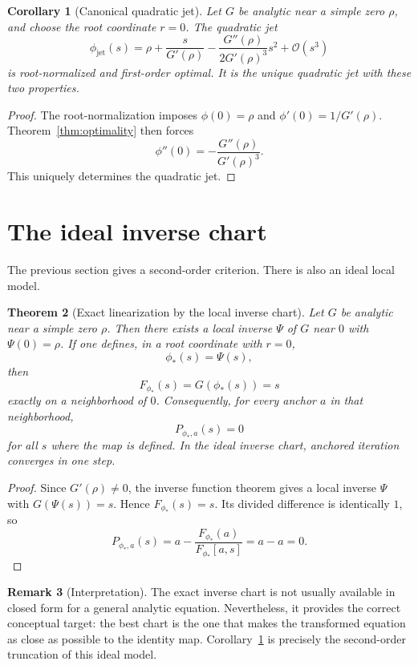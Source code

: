 \documentclass[11pt]{article}
\newtheorem{theorem}{Theorem}[section]
\newtheorem{corollary}[theorem]{Corollary}
\theoremstyle{definition}
\newtheorem{remark}[theorem]{Remark}
\newcommand{\Oterm}{\mathcal{O}}
\begin{document}
\begin{corollary}[Canonical quadratic jet]\label{cor:quadratic-jet}
Let $G$ be analytic near a simple zero $\rho$, and choose the root coordinate $r=0$. The quadratic jet
\begin{equation}\label{eq:jet-optimal}
\phi_{\mathrm{jet}}(s)=\rho+\frac{s}{G'(\rho)}-\frac{G''(\rho)}{2G'(\rho)^3}s^2+\Oterm(s^3)
\end{equation}
is root-normalized and first-order optimal. It is the unique quadratic jet with these two properties.
\end{corollary}

\begin{proof}
The root-normalization imposes $\phi(0)=\rho$ and $\phi'(0)=1/G'(\rho)$. Theorem~\ref{thm:optimality} then forces
\[
\phi''(0)=-\frac{G''(\rho)}{G'(\rho)^3}.
\]
This uniquely determines the quadratic jet.
\end{proof}

\section{The ideal inverse chart}
The previous section gives a second-order criterion. There is also an ideal local model.

\begin{theorem}[Exact linearization by the local inverse chart]\label{thm:inversechart}
Let $G$ be analytic near a simple zero $\rho$. Then there exists a local inverse $\Psi$ of $G$ near $0$ with $\Psi(0)=\rho$. If one defines, in a root coordinate with $r=0$,
\begin{equation}\label{eq:exact-inverse-chart}
\phi_*(s)=\Psi(s),
\end{equation}
then
\[
F_{\phi_*}(s)=G(\phi_*(s))=s
\]
exactly on a neighborhood of $0$. Consequently, for every anchor $a$ in that neighborhood,
\[
P_{\phi_*,a}(s)=0
\]
for all $s$ where the map is defined. In the ideal inverse chart, anchored iteration converges in one step.
\end{theorem}

\begin{proof}
Since $G'(\rho)\neq 0$, the inverse function theorem gives a local inverse $\Psi$ with $G(\Psi(s))=s$. Hence $F_{\phi_*}(s)=s$. Its divided difference is identically $1$, so
\[
P_{\phi_*,a}(s)=a-\frac{F_{\phi_*}(a)}{F_{\phi_*}[a,s]}=a-a=0.
\]
\end{proof}

\begin{remark}[Interpretation]
The exact inverse chart is not usually available in closed form for a general analytic equation. Nevertheless, it provides the correct conceptual target: the best chart is the one that makes the transformed equation as close as possible to the identity map. Corollary~\ref{cor:quadratic-jet} is precisely the second-order truncation of this ideal model.
\end{remark}
\end{document}
